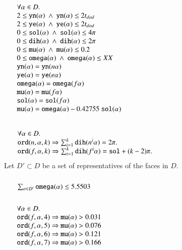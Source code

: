 $$
\begin{array}{lll}
\leftalign\\
   \forall \alpha\in D.\\
    2 \le \optt{yn}(\alpha) \sland
    \optt{yn}(\alpha) \le 2t_{dod} \\
    2 \le \optt{ye}(\alpha) \sland
    \optt{ye}(\alpha) \le 2t_{dod}\\
   0 \le \optt{sol}(\alpha) \sland
     \optt{sol}(\alpha) \le 4 \pi \\
   0 \le \optt{dih}(\alpha) \sland
     \optt{dih}(\alpha) \le 2\pi \\
   0 \le \optt{mu}(\alpha) \sland
      \optt{mu}(\alpha) \le 0.2 \\
   0 \le \optt{omega}(\alpha) \sland
      \optt{omega}(\alpha) \le XX \\
  \optt{yn}(\alpha) = \optt{yn}(n\alpha) \\
  \optt{ye}(\alpha) = \optt{ye}(e\alpha) \\
  \optt{omega}(\alpha) = \optt{omega}(f\alpha) \\
  \optt{mu}(\alpha) = \optt{mu}(f\alpha) \\
  \optt{sol}(\alpha)= \optt{sol}(f\alpha) \\
  \optt{mu}(\alpha) = \optt{omega}(\alpha) - 0.42755\ \optt{sol}(\alpha) \\

\end{array}
$$



$$
\begin{array}{lll}
\leftalign\\
\forall \alpha\in D.\\ 
   \optt{ord}(n,\alpha,k) \Rightarrow
   \sum_{i=1}^k \optt{dih}(n^i\alpha )  = 2\pi.\\
   \optt{ord}(f,\alpha,k) \Rightarrow
   \sum_{i=1}^k \optt{dih}(f^i\alpha ) = \optt{sol} + (k -2)\pi.\\
   \end{array}
$$
\noindent
Let $D'\subset D$ be a set of representatives of the faces in $D$.
$$
\begin{array}{lll}
\leftalign\\
\sum_{\alpha\in D'} \optt{omega}(\alpha) \le 5.5503 \\
\end{array}
$$
$$
\begin{array}{lll}
\leftalign\\
\forall \alpha\in D.\\
   \optt{ord}(f,\alpha,4) \Rightarrow
   \optt{mu}(\alpha) > 0.031 \\
   \optt{ord}(f,\alpha,5) \Rightarrow
   \optt{mu}(\alpha) > 0.076 \\
   \optt{ord}(f,\alpha,6) \Rightarrow
   \optt{mu}(\alpha) > 0.121 \\
   \optt{ord}(f,\alpha,7) \Rightarrow
   \optt{mu}(\alpha) > 0.166 \\
\end{array}
$$

